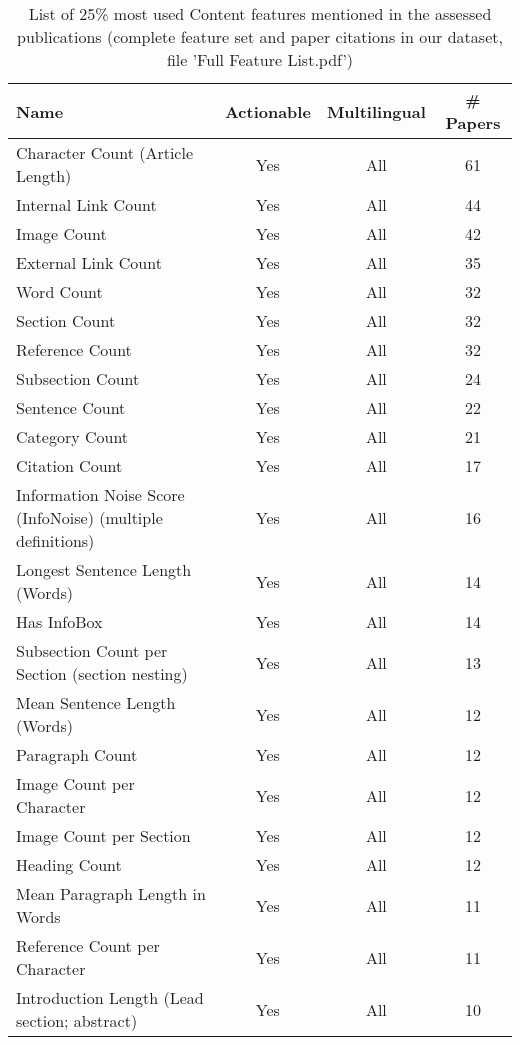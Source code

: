 \begin{table}[htbp]
    \caption{List of 25\% most used Content features mentioned in the assessed publications (complete feature set and paper citations in our dataset, file 'Full Feature List.pdf')}
    \label{tab:feat_Content}
    \centering
    \begin{tabular}{m{} c c c}
        \toprule
        \textbf{Name} & \textbf{Actionable} & \textbf{Multilingual} & \textbf{\# Papers} \\ 
        \midrule
        Character Count (Article Length) & Yes & All & 61 \\
        Internal Link Count & Yes & All & 44 \\
        Image Count & Yes & All & 42 \\
        External Link Count & Yes & All & 35 \\
        Word Count & Yes & All & 32 \\
        Section Count & Yes & All & 32 \\
        Reference Count & Yes & All & 32 \\
        Subsection Count & Yes & All & 24 \\
        Sentence Count & Yes & All & 22 \\
        Category Count & Yes & All & 21 \\
        Citation Count & Yes & All & 17 \\
        Information Noise Score (InfoNoise) (multiple definitions) & Yes & All & 16 \\
        Longest Sentence Length (Words) & Yes & All & 14 \\
        Has InfoBox & Yes & All & 14 \\
        Subsection Count per Section (section nesting) & Yes & All & 13 \\
        Mean Sentence Length (Words) & Yes & All & 12 \\
        Paragraph Count & Yes & All & 12 \\
        Image Count per Character & Yes & All & 12 \\
        Image Count per Section & Yes & All & 12 \\
        Heading Count & Yes & All & 12 \\
        Mean Paragraph Length in Words & Yes & All & 11 \\
        Reference Count per Character & Yes & All & 11 \\
        Introduction Length (Lead section; abstract) & Yes & All & 10 \\

\end{tabular}
\end{table}
